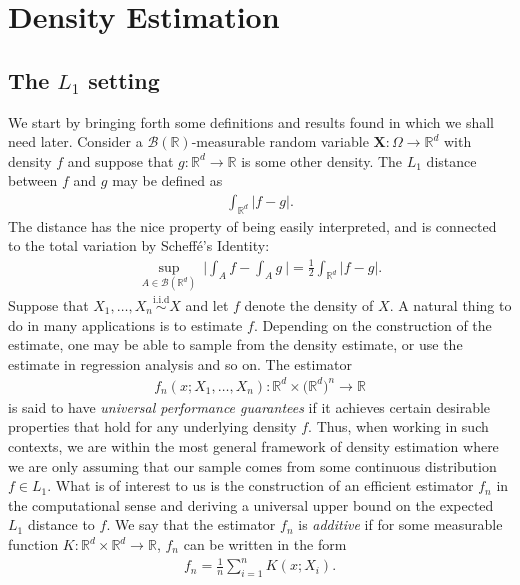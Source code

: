 \documentclass{report}
\begin{document}
\chapter{Density Estimation}
\section{The $L_1$ setting}
We start by bringing forth some definitions and results found in \cite{CMDE} which we shall need later.
Consider a $\mathcal{B}(\mathbb{R})$-measurable random variable $\mathbf{X}:\Omega \rightarrow \mathbb{R}^d$
with density $f$ and suppose that $g : \mathbb{R}^d \rightarrow \mathbb{R}$ is some other density. The $L_1$ distance between $f$ and $g$ may be defined as
\begin{align*}
	\int_{\mathbb{R}^d} |f - g|.
\end{align*}
The distance has the nice property of being easily interpreted, and is connected to the total variation by Scheffé's Identity:
\begin{align*}
	\sup_{A \in \mathcal{B}(\mathbb{R}^d)} \ \bigg| \int_A f - \int_A g \ \bigg| = \frac{1}{2}\int_{\mathbb{R}^d} |f - g|.
\end{align*}
Suppose that $X_1,\dots,X_n \overset{\text{i.i.d}}{\sim} X$ and let $f$ denote the density of $X$. A natural thing to do in many applications is to estimate $f$.
Depending on the construction of the estimate, one may be able to sample from the density estimate, or use the estimate in regression analysis and so on. The estimator
\begin{align*}
	f_n(x; X_1,\dots,X_n) : \mathbb{R}^d \times \big(\mathbb{R}^d\big)^n \rightarrow \mathbb{R}
\end{align*}
is said to have \textit{universal performance guarantees} if it achieves certain desirable properties \cite{CMDE} that hold for any underlying density $f$. Thus, when working in such contexts, we 
are within the most general framework of density estimation where we are only assuming that our sample comes from some continuous distribution $f \in L_1$. 
\newpage
What is of interest to us is the construction of an efficient
estimator $f_n$ in the computational sense and deriving a universal upper bound on the expected $L_1$ distance to $f$.
We say that the estimator $f_n$ is \textit{additive} if for some measurable function $K : \mathbb{R}^d \times \mathbb{R}^d \rightarrow \mathbb{R}$, $f_n$ can be written in the form
\begin{align*}
	f_n = \frac{1}{n}\sum_{i=1}^n K(x; X_i).
\end{align*}
\end{document}

